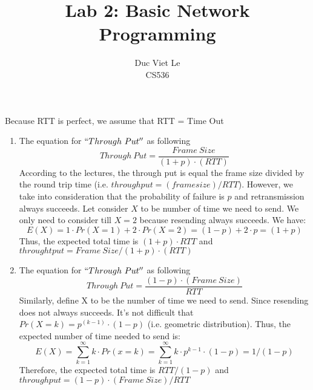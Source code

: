 \documentclass[12pt]{article}
\newenvironment{problem}[2][Problem]{\begin{trivlist}
\item[\hskip \labelsep {\bfseries #1}\hskip \labelsep {\bfseries #2.}]}{\end{trivlist}}
\begin{document}
 
\title{Lab 2: Basic Network Programming}
\author{Duc Viet Le\\ 
CS536}
 
\maketitle
 
\begin{problem}{1}
	
\end{problem}
Because RTT is perfect, we assume that RTT = Time Out
\begin{enumerate}
	\item The equation for $``Through\ Put''$ as following
	$$Through\ Put = \frac{Frame\ Size}{(1+p)\cdot(RTT)}$$
	According to the lectures, the through put is equal the frame size divided by the round trip time (i.e. $\displaystyle throughput = (frame size)/RTT$). However, we take into consideration that the probability of failure is $p$ and retransmission always succeeds. Let consider $X$ to be number of time we need to send. We only need to consider till $X=2$ because resending always succeeds. We have: 
	$$E(X) = 1\cdot Pr(X = 1) + 2\cdot Pr(X = 2) = (1-p) + 2\cdot p = (1+p)$$
	 Thus, the expected total time is $(1+p)\cdot RTT$ and $throughtput= {Frame\ Size}/{(1+p)\cdot(RTT)}$
	\item The equation for $``Through\ Put''$ as following
	$$Through\ Put = \frac{(1-p)\cdot(Frame\ Size)}{RTT}$$
	Similarly, define X to be the number of time we need to send. Since resending does not always succeeds. It's not difficult that $Pr(X=k)=p^{(k-1)}\cdot (1-p)$ (i.e. geometric distribution). Thus, the expected number of time needed to send is:
	$$E(X) =\sum^\infty_{k=1}k\cdot Pr(x=k) = \sum^\infty_{k=1}k\cdot p^{k-1}\cdot(1-p) = 1/(1-p)$$
 	Therefore, the expected total time is $RTT/(1-p)$ and $throughput = (1-p)\cdot(Frame\ Size)/RTT$  
\end{enumerate}
\end{document}
